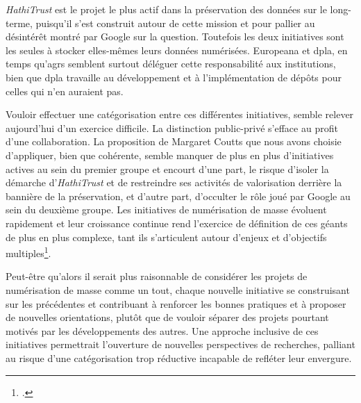 \textit{HathiTrust} est le projet le plus actif dans la préservation des données sur le long-terme, puisqu'il s'est construit autour de cette mission et pour pallier au désintérêt montré par Google sur la question. Toutefois les deux initiatives sont les seules à stocker elles-mêmes leurs données numérisées. Europeana et \gls{dpla}, en temps qu'\gls{agr}s semblent surtout déléguer cette responsabilité aux institutions, bien que \gls{dpla} travaille au développement et à l'implémentation de dépôts pour celles qui n'en auraient pas.

Vouloir effectuer une catégorisation entre ces différentes initiatives, semble relever aujourd'hui d'un exercice difficile. La distinction public-privé s'efface au profit d'une collaboration. La proposition de Margaret Coutts que nous avons choisie d'appliquer, bien que cohérente, semble manquer de plus en plus d'initiatives actives au sein du premier groupe et encourt d'une part, le risque d'isoler la démarche d'\textit{HathiTrust} et de restreindre ses activités de valorisation derrière la bannière de la préservation, et d'autre part, d'occulter le rôle joué par Google au sein du deuxième groupe. Les initiatives de numérisation de masse évoluent rapidement et leur croissance continue rend l'exercice de définition de ces géants de plus en plus complexe, tant ils s'articulent autour d'enjeux et d'objectifs multiples\footcite{thylstrup_politics_2018}. 

Peut-être qu'alors il serait plus raisonnable de considérer les projets de numérisation de masse comme un tout, chaque nouvelle initiative se construisant sur les précédentes et contribuant à renforcer les bonnes pratiques et à proposer de nouvelles orientations, plutôt que de vouloir séparer des projets pourtant motivés par les développements des autres. Une approche inclusive de ces initiatives permettrait l'ouverture de nouvelles perspectives de recherches, palliant au risque d'une catégorisation trop réductive incapable de refléter leur envergure.






 










